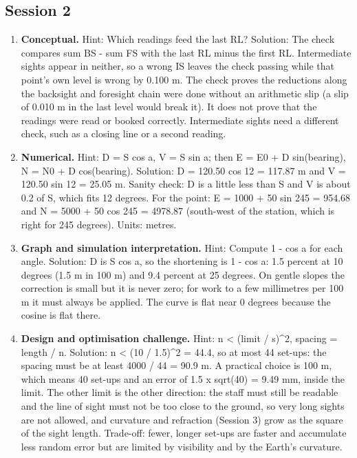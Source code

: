 \documentclass[11pt,a4paper]{article}
\begin{document}
\subsection*{Session 2}
\begin{enumerate}[nosep]
\item \textbf{Conceptual.} Hint: Which readings feed the last RL? Solution: The check compares sum BS - sum FS with the last RL minus the first RL. Intermediate sights appear in neither, so a wrong IS leaves the check passing while that point's own level is wrong by 0.100 m. The check proves the reductions along the backsight and foresight chain were done without an arithmetic slip (a slip of 0.010 m in the last level would break it). It does not prove that the readings were read or booked correctly. Intermediate sights need a different check, such as a closing line or a second reading.
\item \textbf{Numerical.} Hint: D = S cos a, V = S sin a; then E = E0 + D sin(bearing), N = N0 + D cos(bearing). Solution: D = 120.50 cos 12 = 117.87 m and V = 120.50 sin 12 = 25.05 m. Sanity check: D is a little less than S and V is about 0.2 of S, which fits 12 degrees. For the point: E = 1000 + 50 sin 245 = 954.68 and N = 5000 + 50 cos 245 = 4978.87 (south-west of the station, which is right for 245 degrees). Units: metres.
\item \textbf{Graph and simulation interpretation.} Hint: Compute 1 - cos a for each angle. Solution: D is S cos a, so the shortening is 1 - cos a: 1.5 percent at 10 degrees (1.5 m in 100 m) and 9.4 percent at 25 degrees. On gentle slopes the correction is small but it is never zero; for work to a few millimetres per 100 m it must always be applied. The curve is flat near 0 degrees because the cosine is flat there.
\item \textbf{Design and optimisation challenge.} Hint: n \textless{} (limit / s)\textasciicircum{}2, spacing = length / n. Solution: n \textless{} (10 / 1.5)\textasciicircum{}2 = 44.4, so at most 44 set-ups: the spacing must be at least 4000 / 44 = 90.9 m. A practical choice is 100 m, which means 40 set-ups and an error of 1.5 x sqrt(40) = 9.49 mm, inside the limit. The other limit is the other direction: the staff must still be readable and the line of sight must not be too close to the ground, so very long sights are not allowed, and curvature and refraction (Session 3) grow as the square of the sight length. Trade-off: fewer, longer set-ups are faster and accumulate less random error but are limited by visibility and by the Earth's curvature.
\end{enumerate}
\end{document}
